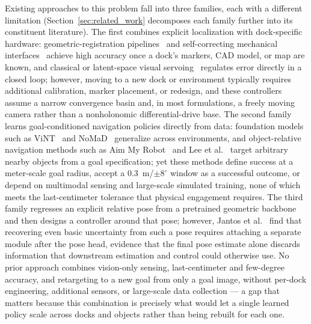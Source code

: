 \documentclass[letterpaper, 10 pt, conference]{IEEEtran}  %
\begin{document}
Existing approaches to this problem fall into three families, each with a different limitation (Section~\ref{sec:related_work} decomposes each family further into its constituent literature). The first combines explicit localization with dock-specific hardware: geometric-registration pipelines~\cite{gutierrez2025docking} and self-correcting mechanical interfaces~\cite{cao2024dockmech} achieve high accuracy once a dock's markers, CAD model, or map are known, and classical or latent-space visual servoing~\cite{felton2022latentvs} regulates error directly in a closed loop; however, moving to a new dock or environment typically requires additional calibration, marker placement, or redesign, and these controllers assume a narrow convergence basin and, in most formulations, a freely moving camera rather than a nonholonomic differential-drive base. The second family learns goal-conditioned navigation policies directly from data: foundation models such as ViNT~\cite{shah2023vint} and NoMaD~\cite{c1} generalize across environments, and object-relative navigation methods such as Aim My Robot~\cite{meng2025aim} and Lee et al.~\cite{lee2026lastmeter} target arbitrary nearby objects from a goal specification; yet these methods define success at a meter-scale goal radius, accept a 0.3~m/$\pm 8^\circ$ window as a successful outcome, or depend on multimodal sensing and large-scale simulated training, none of which meets the last-centimeter tolerance that physical engagement requires. The third family regresses an explicit relative pose from a pretrained geometric backbone~\cite{c4,vggt2025} and then designs a controller around that pose; however, Jantos et al.~\cite{jantos2025aleatoric} find that recovering even basic uncertainty from such a pose requires attaching a separate module after the pose head, evidence that the final pose estimate alone discards information that downstream estimation and control could otherwise use. No prior approach combines vision-only sensing, last-centimeter and few-degree accuracy, and retargeting to a new goal from only a goal image, without per-dock engineering, additional sensors, or large-scale data collection --- a gap that matters because this combination is precisely what would let a single learned policy scale across docks and objects rather than being rebuilt for each one.
\end{document}
